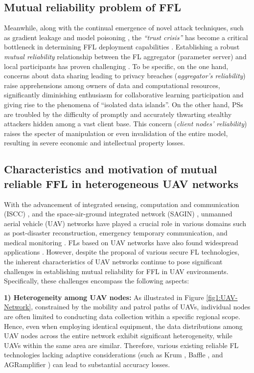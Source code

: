 \documentclass[lettersize,journal]{IEEEtran}
\begin{document}
\subsection{Mutual reliability problem of FFL}
Meanwhile, along with the continual emergence of novel attack techniques, such as gradient leakage and model poisoning \cite{fang2020local}, the \textit{``trust crisis''} \cite{zhou2022multi} has become a critical bottleneck in determining FFL deployment capabilities \cite{rodriguez2023survey}. Establishing a robust \textit{mutual reliability} relationship between the FL aggregator (parameter server) and local participants has proven challenging \cite{zhou2022multi}. To be specific, on the one hand, concerns about data sharing leading to privacy breaches (\textit{aggregator's reliability}) \cite{wang2021variational} raise apprehensions among owners of data and computational resources, significantly diminishing enthusiasm for collaborative learning participation and giving rise to the phenomena of ``isolated data islands''. On the other hand, PSs are troubled by the difficulty of promptly and accurately thwarting stealthy attackers hidden among a vast client base. This concern  (\textit{client nodes' reliability}) raises the specter of manipulation or even invalidation of the entire model, resulting in severe economic and intellectual property losses. 

\subsection{Characteristics and motivation of mutual reliable FFL in heterogeneous UAV networks}
With the advancement of integrated sensing, computation and communication (ISCC) \cite{he2023integrated}, and the space-air-ground integrated network (SAGIN) \cite{shen2023survey}, unmanned aerial vehicle (UAV) networks have played a crucial role in various domains such as post-disaster reconstruction, emergency temporary communication, and medical monitoring \cite{lu2023uav}. FLs based on UAV networks have also found widespread applications \cite{ETT1, ETT3, pandya2023federated}. However, despite the proposal of various secure FL technologies, the inherent characteristics of UAV networks continue to pose significant challenges in establishing mutual reliability for FFL in UAV environments. Specifically, these challenges encompass the following aspects:

\textbf{1) Heterogeneity among UAV nodes:} As illustrated in Figure \ref{fig1:UAV-Network}, constrained by the mobility and patrol paths of UAVs, individual nodes are often limited to conducting data collection within a specific regional scope. Hence, even when employing identical equipment, the data distributions among UAV nodes across the entire network exhibit significant heterogeneity, while UAVs within the same area are similar. Therefore, various existing reliable FL technologies lacking adaptive considerations (such as Krum \cite{blanchard2017machine-krum}, Baffle \cite{andreina2021baffle}, and AGRamplifier \cite{gong2023agramplifier}) can lead to substantial accuracy losses.
\end{document}
